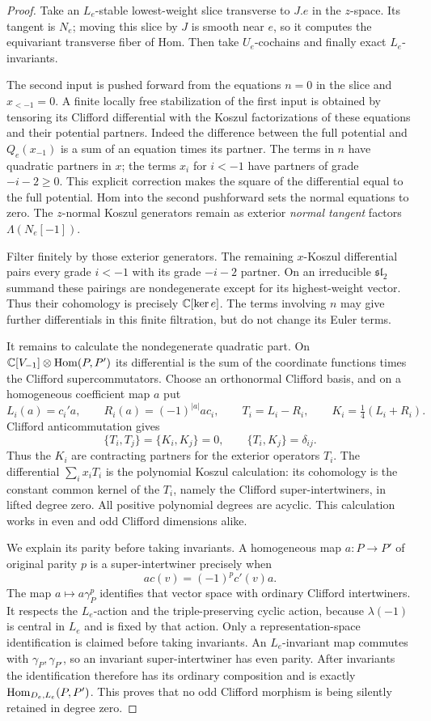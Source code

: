 \begin{proof}
Take an $L_e$-stable lowest-weight slice transverse to $J.e$ in the
$z$-space.  Its tangent is $N_e$; moving this slice by $J$ is smooth
near $e$, so it computes the equivariant transverse fiber of Hom.
Then take $U_e$-cochains and finally exact $L_e$-invariants.

The second input is pushed forward from the equations $n=0$ in the
slice and $x_{<-1}=0$.  A finite locally free stabilization of the
first input is obtained by tensoring its Clifford differential with
the Koszul factorizations of these equations and their potential
partners.  Indeed the difference between the full potential and
$Q_e(x_{-1})$ is a sum of an equation times its partner.  The terms in
$n$ have quadratic partners in $x$; the terms $x_i$ for $i<-1$ have
partners of grade $-i-2\ge0$.  This explicit correction makes the
square of the differential equal to the full potential.
Hom into the second pushforward sets the normal equations to zero.
The $z$-normal Koszul generators remain as exterior \emph{normal
tangent} factors $\Lambda(N_e[-1])$.

Filter finitely by those exterior generators.  The remaining
$x$-Koszul differential pairs every grade $i<-1$ with its grade
$-i-2$ partner.  On an irreducible $\mathfrak{sl}_2$ summand these
pairings are nondegenerate except for its highest-weight vector.
Thus their cohomology is precisely $\mathbb C[\ker e]$.  The terms involving
$n$ may give further differentials in this finite filtration, but do
not change its Euler terms.

It remains to calculate the nondegenerate quadratic part.  On
$\mathbb C[V_{-1}]\otimes\operatorname{Hom}(P,P')$ its differential is the sum of the
coordinate functions times the Clifford supercommutators.  Choose an
orthonormal Clifford basis, and on a homogeneous coefficient map $a$
put
\[
 L_i(a)=c_i'a,\qquad R_i(a)=(-1)^{|a|}ac_i,\qquad
 T_i=L_i-R_i,\qquad K_i=\tfrac14(L_i+R_i).
\]
Clifford anticommutation gives
\[
 \{T_i,T_j\}=\{K_i,K_j\}=0,\qquad
 \{T_i,K_j\}=\delta_{ij}.
\]
Thus the $K_i$ are contracting partners for the exterior operators
$T_i$.  The differential $\sum_i x_iT_i$ is the polynomial Koszul
calculation: its cohomology is the constant common kernel of the
$T_i$, namely the Clifford super-intertwiners, in lifted degree zero.
All positive polynomial degrees are acyclic.  This calculation works
in even and odd Clifford dimensions alike.

We explain its parity before taking invariants.  A homogeneous map
$a:P\to P'$ of original parity $p$ is a super-intertwiner precisely
when
\[
 a c(v)=(-1)^p c'(v)a.
\]
The map $a\mapsto a\gamma_P^p$ identifies that vector space with
ordinary Clifford intertwiners.  It respects the $L_e$-action and the
triple-preserving cyclic action, because $\lambda(-1)$ is central in
$L_e$ and is fixed by that action.  Only a representation-space
identification is claimed before taking invariants.  An $L_e$-invariant
map commutes with $\gamma_P,\gamma_{P'}$, so an invariant
super-intertwiner has even parity.  After invariants the identification
therefore has its ordinary composition and is exactly
$\operatorname{Hom}_{D_e,L_e}(P,P')$.  This proves that no odd Clifford morphism is
being silently retained in degree zero.


\end{proof}
